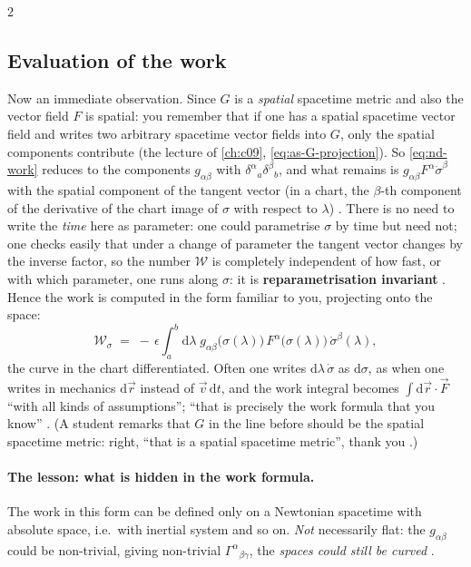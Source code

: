 \begin{paracol}{2}
\subsection{Evaluation of the work}\label{ssec:nd-work-eval}

Now an immediate observation. Since $G$ is a \emph{spatial} spacetime metric and also the vector field $F$ is spatial: you remember that if one has a spatial spacetime vector field and writes two arbitrary spacetime vector fields into $G$, only the spatial components contribute (the lecture of \cref{ch:c09}, \eqref{eq:as-G-projection}).
So \eqref{eq:nd-work} reduces to the components $g_{\alpha\beta}$ with $\delta^\alpha{}_a\delta^\beta{}_b$, and what remains is $g_{\alpha\beta}F^\alpha\dot\sigma^\beta$ with the spatial component of the tangent vector (in a chart, the $\beta$-th component of the derivative of the chart image of $\sigma$ with respect to $\lambda$) .
There is no need to write the \emph{time} here as parameter: one could parametrise $\sigma$ by time but need not; one checks easily that under a change of parameter the tangent vector changes by the inverse factor, so the number $\mathcal W$ is completely independent of how fast, or with which parameter, one runs along $\sigma$: it is \textbf{reparametrisation invariant} .
Hence the work is computed in the form familiar to you, projecting onto the space:
\begin{equation}\label{eq:nd-work-chart}
  \mathcal W_\sigma\;=\;-\,\epsilon\int_a^b\mathrm d\lambda\;g_{\alpha\beta}\bigl(\sigma(\lambda)\bigr)\,F^\alpha\bigl(\sigma(\lambda)\bigr)\,\dot\sigma^\beta(\lambda) ,
\end{equation}
the curve in the chart differentiated. Often one writes $\mathrm d\lambda\,\dot\sigma$ as $\mathrm d\sigma$, as when one writes in mechanics $\mathrm d\vec r$ instead of $\vec v\,\mathrm dt$, and the work integral becomes $\int\mathrm d\vec r\cdot\vec F$ ``with all kinds of assumptions''; ``that is precisely the work formula that you know'' .
(A student remarks that $G$ in the line before should be the spatial spacetime metric: right, ``that is a spatial spacetime metric'', thank you .)

\paragraph{The lesson: what is hidden in the work formula.} The work in this form can be defined only on a Newtonian spacetime with absolute space, i.e.\ with inertial system and so on. \emph{Not} necessarily flat: the $g_{\alpha\beta}$ could be non-trivial, giving non-trivial $\Gamma^\alpha{}_{\beta\gamma}$, the \emph{spaces could still be curved} .


\end{paracol}

